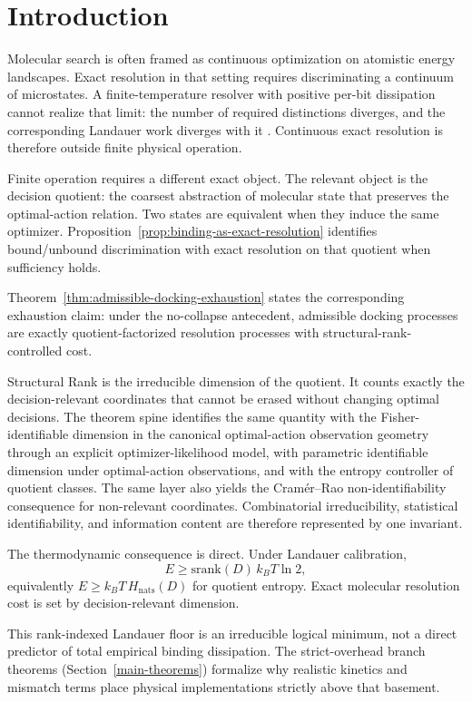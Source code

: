 \section{Introduction}\label{introduction}

Molecular search is often framed as continuous optimization on atomistic energy landscapes. Exact resolution in that setting requires discriminating a continuum of microstates. A finite-temperature resolver with positive per-bit dissipation cannot realize that limit: the number of required distinctions diverges, and the corresponding Landauer work diverges with it \cite{landauer1961irreversibility,bennett1982thermodynamics}. Continuous exact resolution is therefore outside finite physical operation.

Finite operation requires a different exact object. The relevant object is the decision quotient: the coarsest abstraction of molecular state that preserves the optimal-action relation. Two states are equivalent when they induce the same optimizer. Proposition~\ref{prop:binding-as-exact-resolution} identifies bound/unbound discrimination with exact resolution on that quotient when sufficiency holds.

Theorem~\ref{thm:admissible-docking-exhaustion} states the corresponding exhaustion claim: under the no-collapse antecedent, admissible docking processes are exactly quotient-factorized resolution processes with structural-rank-controlled cost.

Structural Rank is the irreducible dimension of the quotient. It counts exactly the decision-relevant coordinates that cannot be erased without changing optimal decisions. The theorem spine identifies the same quantity with the Fisher-identifiable dimension in the canonical optimal-action observation geometry through an explicit optimizer-likelihood model, with parametric identifiable dimension under optimal-action observations, and with the entropy controller of quotient classes. The same layer also yields the Cram\'er--Rao non-identifiability consequence for non-relevant coordinates. Combinatorial irreducibility, statistical identifiability, and information content are therefore represented by one invariant.

The thermodynamic consequence is direct. Under Landauer calibration,
\[
E \ge \mathrm{srank}(D)\,k_B T\ln 2,
\]
equivalently $E \ge k_B T\,H_{\mathrm{nats}}(D)$ for quotient entropy. Exact molecular resolution cost is set by decision-relevant dimension.

This rank-indexed Landauer floor is an irreducible logical minimum, not a direct predictor of total empirical binding dissipation. The strict-overhead branch theorems (Section~\ref{main-theorems}) formalize why realistic kinetics and mismatch terms place physical implementations strictly above that basement.

